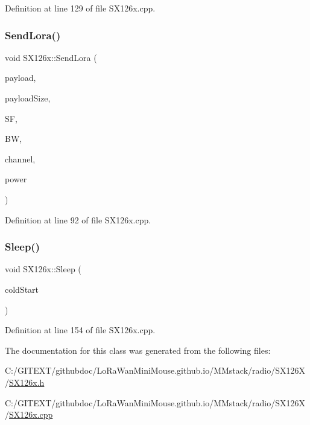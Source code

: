 Definition at line 129 of file S\+X126x.\+cpp.

\mbox{\label{class_s_x126x_a9199137a513971e5af0b5be2637cb19a}} 
\subsubsection{\texorpdfstring{Send\+Lora()}{SendLora()}}
{\footnotesize\ttfamily void S\+X126x\+::\+Send\+Lora (\begin{DoxyParamCaption}\item[{uint8\+\_\+t $\ast$}]{payload,  }\item[{uint8\+\_\+t}]{payload\+Size,  }\item[{uint8\+\_\+t}]{SF,  }\item[{\mbox{\hyperlink{_define_8h_a6cbb491180e131f374cdbe63880c85e1}{e\+Band\+Width}}}]{BW,  }\item[{uint32\+\_\+t}]{channel,  }\item[{int8\+\_\+t}]{power }\end{DoxyParamCaption})}



Definition at line 92 of file S\+X126x.\+cpp.

\mbox{\label{class_s_x126x_a920aa7de87e1b05c47ad1a95002e00c2}} 
\subsubsection{\texorpdfstring{Sleep()}{Sleep()}}
{\footnotesize\ttfamily void S\+X126x\+::\+Sleep (\begin{DoxyParamCaption}\item[{bool}]{cold\+Start }\end{DoxyParamCaption})}



Definition at line 154 of file S\+X126x.\+cpp.



The documentation for this class was generated from the following files\+:\begin{DoxyCompactItemize}
\item 
C\+:/\+G\+I\+T\+E\+X\+T/githubdoc/\+Lo\+Ra\+Wan\+Mini\+Mouse.\+github.\+io/\+M\+Mstack/radio/\+S\+X126\+X/\mbox{\hyperlink{_s_x126x_8h}{S\+X126x.\+h}}\item 
C\+:/\+G\+I\+T\+E\+X\+T/githubdoc/\+Lo\+Ra\+Wan\+Mini\+Mouse.\+github.\+io/\+M\+Mstack/radio/\+S\+X126\+X/\mbox{\hyperlink{_s_x126x_8cpp}{S\+X126x.\+cpp}}\end{DoxyCompactItemize}

